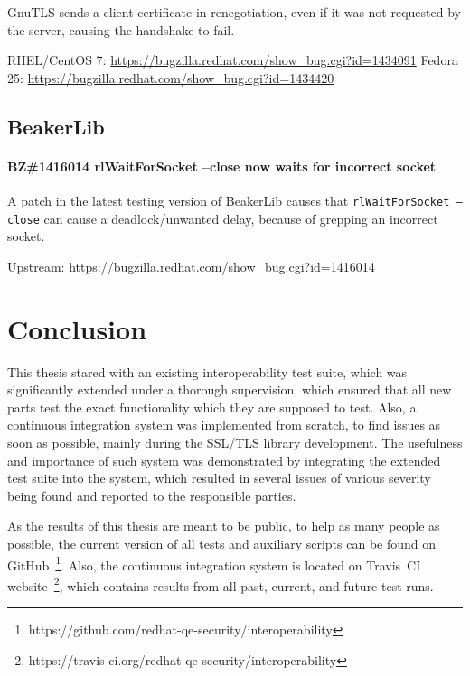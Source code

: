     GnuTLS sends a client certificate in renegotiation, even if it was not
    requested by the server, causing the handshake to fail.

    \medskip\noindent RHEL/CentOS 7: \url{https://bugzilla.redhat.com/show_bug.cgi?id=1434091}
    \newline\noindent Fedora 25: \url{https://bugzilla.redhat.com/show_bug.cgi?id=1434420}

\section{BeakerLib}
\subsubsection*{BZ\#1416014  \newline
    rlWaitForSocket --close now waits for incorrect socket}

    A patch in the latest testing version of BeakerLib causes that
    \texttt{rlWaitForSocket --close} can cause a deadlock/unwanted delay,
    because of grepping an incorrect socket.

    \medskip\noindent Upstream: \url{https://bugzilla.redhat.com/show_bug.cgi?id=1416014}

\chapter {Conclusion} \label{chap:conclusion}
    This thesis stared with an existing interoperability test suite, which
    was significantly extended under a thorough supervision, which ensured
    that all new parts test the exact functionality which they are supposed to
    test. Also, a continuous integration system was implemented from scratch, to
    find issues as soon as possible, mainly during the SSL/TLS library development.
    The usefulness and importance of such system was demonstrated by integrating
    the extended test suite into the system, which resulted in several issues
    of various severity being found and reported to the responsible parties.

    As the results of this thesis are meant to be public, to help as many
    people as possible, the current version of all tests and auxiliary scripts
    can be found on GitHub~\footnote{https://github.com/redhat-qe-security/interoperability}.
    Also, the continuous integration system is located on Travis~CI
    website~\footnote{https://travis-ci.org/redhat-qe-security/interoperability},
    which contains results from all past, current, and future test runs.

